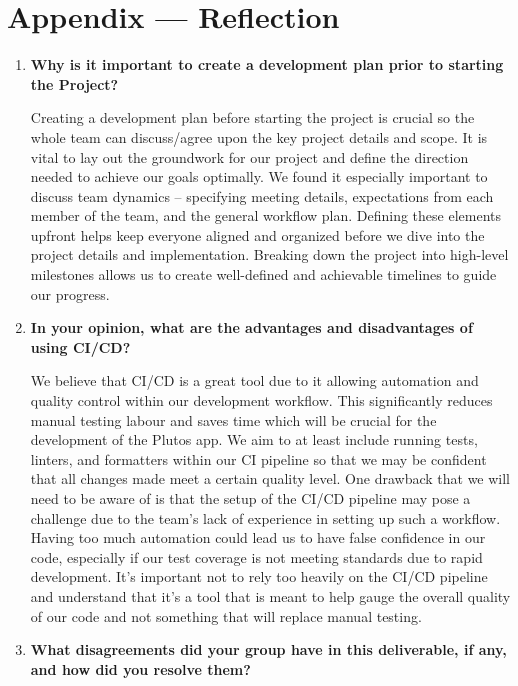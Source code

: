 \documentclass{article}
\begin{document}
\newpage{}

\section{Appendix --- Reflection}

\begin {enumerate}
\item \textbf{Why is it important to create a development plan prior to starting the
Project?}

Creating a development plan before starting the project is crucial so the whole team can discuss/agree upon the key project details and scope. It is vital to lay out the groundwork for our project and define the direction needed to achieve our goals optimally. We found it especially important to discuss team dynamics – specifying meeting details, expectations from each member of the team, and the general workflow plan. Defining these elements upfront helps keep everyone aligned and organized before we dive into the project details and implementation. Breaking down the project into high-level milestones allows us to create well-defined and achievable timelines to guide our progress.

\item \textbf{In your opinion, what are the advantages and disadvantages of using CI/CD?}

We believe that CI/CD is a great tool due to it allowing automation and quality control within our development workflow. This significantly reduces manual testing labour and saves time which will be crucial for the development of the Plutos app. We aim to at least include running tests, linters, and formatters within our CI pipeline so that we may be confident that all changes made meet a certain quality level. One drawback that we will need to be aware of is that the setup of the CI/CD pipeline may pose a challenge due to the team’s lack of experience in setting up such a workflow. Having too much automation could lead us to have false confidence in our code, especially if our test coverage is not meeting standards due to rapid development. It’s important not to rely too heavily on the CI/CD pipeline and understand that it’s a tool that is meant to help gauge the overall quality of our code and not something that will replace manual testing.

\item \textbf{What disagreements did your group have in this deliverable, if any, and how did you resolve them?}


\end{enumerate}
\end{document}
